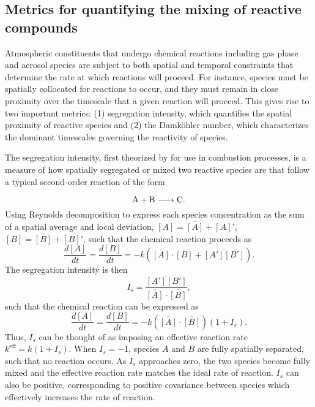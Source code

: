 \subsection{Metrics for quantifying the mixing of reactive compounds}
Atmospheric constituents that undergo chemical reactions including gas phase and aerosol species are subject to both spatial and temporal constraints that determine the rate at which reactions will proceed. For instance, species must be spatially collocated for reactions to occur, and they must remain in close proximity over the timescale that a given reaction will proceed. This gives rise to two important metrics: (1) segregation intensity, which quantifies the spatial proximity of reactive species and (2) the Damköhler number, which characterizes the dominant timescales governing the reactivity of species.

The segregation intensity, first theorized by \cite{danckwerts_definition_1952} for use in combustion processes, is a measure of how spatially segregated or mixed two reactive species are that follow a typical second-order reaction of the form

\begin{equation}
\ce{A + B -> C}.
\end{equation}
Using Reynolds decomposition to express each species concentration as the sum of a spatial average and local deviation, $[A] = \overline{[A]} + [A]'$, $[B] = \overline{[B]} + [B]'$, such that the  chemical reaction proceeds as 
\begin{equation}
\frac{d[A]}{dt} = \frac{d[B]}{dt} = -k\left(\overline{[A]}\cdot\overline{[B]} + \overline{[A'][B']} \right).
\end{equation}
The segregation intensity is then 
\begin{equation}
I_s = \frac{\overline{[A'][B']}}{\overline{[A]}\cdot\overline{[B]}},
\end{equation}
such that the chemical reaction can be expressed as 
\begin{equation}
\frac{d[A]}{dt} = \frac{d[B]}{dt} = -k\left(\overline{[A]}\cdot\overline{[B]}\right)\left(1 + I_s \right).
\end{equation}
Thus, $I_s$ can be thought of as imposing an effective reaction rate $k^{\text{eff}} = k(1+I_s)$. When $I_s = -1$, species $A$ and $B$ are fully spatially separated, such that no reaction occurs. As $I_s$ approaches zero, the two species become fully mixed and the effective reaction rate matches the ideal rate of reaction. $I_s$ can also be positive, corresponding to positive covariance between species which effectively increases the rate of reaction.

